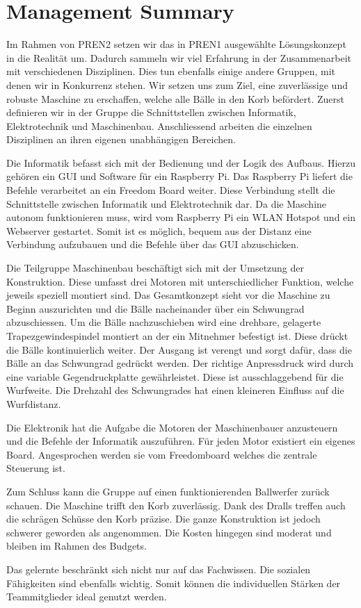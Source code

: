 \section{Management Summary}

Im Rahmen von PREN2 setzen wir das in PREN1 ausgewählte Lösungskonzept in die Realität um. Dadurch sammeln wir viel Erfahrung in der Zusammenarbeit mit verschiedenen Disziplinen. Dies tun ebenfalls einige andere Gruppen, mit denen wir in Konkurrenz stehen. Wir setzen uns zum Ziel, eine zuverlässige und robuste Maschine zu erschaffen, welche alle Bälle in den Korb befördert.
Zuerst definieren wir in der Gruppe die Schnittstellen zwischen Informatik, Elektrotechnik und Maschinenbau. Anschliessend arbeiten die einzelnen Disziplinen an ihren eigenen unabhängigen Bereichen.

Die Informatik befasst sich mit der Bedienung und der Logik des Aufbaus. Hierzu gehören ein GUI und Software für ein Raspberry Pi. Das Raspberry Pi liefert die Befehle verarbeitet an ein Freedom Board weiter. Diese Verbindung stellt die Schnittstelle zwischen Informatik und Elektrotechnik dar. Da die Maschine autonom funktionieren muss, wird vom Raspberry Pi ein WLAN Hotspot und ein Webserver gestartet. Somit ist es möglich, bequem aus der Distanz eine Verbindung aufzubauen und die Befehle über das GUI abzuschicken.

Die Teilgruppe Maschinenbau beschäftigt sich mit der Umsetzung der Konstruktion. Diese umfasst drei Motoren mit unterschiedlicher Funktion, welche jeweils speziell montiert sind. Das Gesamtkonzept sieht vor die Maschine zu Beginn auszurichten und die Bälle nacheinander über ein Schwungrad abzuschiessen. Um die Bälle nachzuschieben wird eine drehbare, gelagerte Trapezgewindespindel montiert an der ein Mitnehmer befestigt ist. Diese drückt die Bälle kontinuierlich weiter. Der Ausgang ist verengt und sorgt dafür, dass die Bälle an das Schwungrad gedrückt werden. Der richtige Anpressdruck wird durch eine variable Gegendruckplatte gewährleistet. Diese ist ausschlaggebend für die Wurfweite. Die Drehzahl des Schwungrades hat einen kleineren Einfluss auf die Wurfdistanz.

Die Elektronik hat die Aufgabe die Motoren der Maschinenbauer anzusteuern und die Befehle der Informatik auszuführen.
Für jeden Motor existiert ein eigenes Board. Angesprochen werden sie vom Freedomboard welches die zentrale Steuerung ist.

Zum Schluss kann die Gruppe auf einen funktionierenden Ballwerfer zurück schauen. Die Maschine trifft den Korb zuverlässig. Dank des Dralls treffen auch die schrägen Schüsse den Korb präzise. Die ganze Konstruktion ist jedoch schwerer geworden als angenommen. Die Kosten hingegen sind moderat und bleiben im Rahmen des Budgets.

Das gelernte beschränkt sich nicht nur auf das Fachwissen. Die sozialen Fähigkeiten sind ebenfalls wichtig. Somit können die individuellen Stärken der Teammitglieder ideal genutzt werden.
